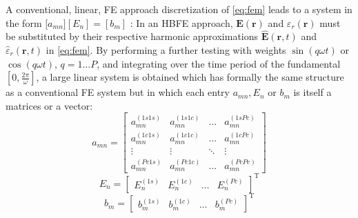\documentclass[journal]{IEEEtran}
\renewcommand{\vec}[1]{\mathbf{#1}}
\begin{document}
A conventional, linear, FE approach discretization of \eqref{eq:fem} 
leads to a system in the form [$a_{mn}][E_n] = [b_m]$ \cite{Pelosi2009}:
In an HBFE approach, $\vec{E}(\vec{r})$ and
${\varepsilon}_r(\vec{r})$ must be substituted by their respective harmonic approximations $\vec{\hat{E}}(\vec{r}, t)$ and $\hat{{\varepsilon}}_r(\vec{r}, t)$ in \eqref{eq:fem}.  By performing
a further testing with weights $\sin(q \omega t)$ or
$\cos(q \omega t)$, $q = 1 \dots P$, and integrating over the time period of the fundamental $\left [
0,\frac{2\pi}{\omega} \right ]$,  a large linear system is
obtained which has formally the same structure as 
a conventional FE system but in which each entry $a_{mn}, E_n$ or $b_m$
is itself a matrices or a vector:
%
\begin{equation}\label{e:HBfemmn}
a_{mn}=
\begin{bmatrix}
a_{mn}^{(1s1s)} & a_{mn}^{(1s1c)} & \ldots &  a_{mn}^{(1sPc)} \\
a_{mn}^{(1c1s)} & a_{mn}^{(1c1c)} & \ldots &  a_{mn}^{(1cPc)} \\
\vdots & \vdots & \ddots & \vdots \\
a_{mn}^{(Pc1s)} & a_{mn}^{(Pc1c)} & \ldots &  a_{mn}^{(PcPc)}
\end{bmatrix}
\end{equation}
\begin{equation} 
E_n = 
\begin{bmatrix}
E_{n}^{(1s)} &
E_{n}^{(1c)} &
\ldots &
E_{n}^{(Pc)}
\end{bmatrix}^\text{T}
\end{equation}
\begin{equation}
b_m = 
\begin{bmatrix}
b_{m}^{(1s)} &
b_{m}^{(1c)} &
\ldots &
b_{m}^{(Pc)}
\end{bmatrix}^\text{T}
\end{equation}
\end{document}
